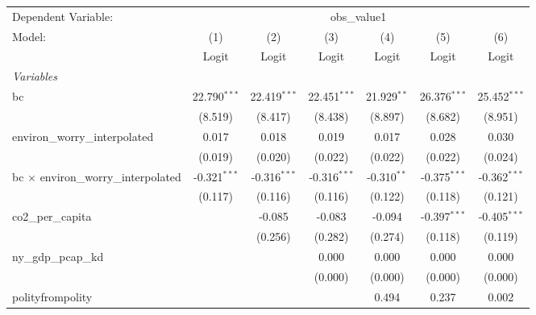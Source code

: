 
\begingroup
\centering
\begin{tabular}{lcccccc}
   \toprule
   Dependent Variable: & \multicolumn{6}{c}{obs\_value1}\\
   Model:                                      & (1)            & (2)            & (3)            & (4)           & (5)            & (6)\\  
                                               &  Logit         & Logit          & Logit          & Logit         & Logit          & Logit\\  
   \midrule
   \emph{Variables}\\
   bc                                          & 22.790$^{***}$ & 22.419$^{***}$ & 22.451$^{***}$ & 21.929$^{**}$ & 26.376$^{***}$ & 25.452$^{***}$\\   
                                               & (8.519)        & (8.417)        & (8.438)        & (8.897)       & (8.682)        & (8.951)\\   
   environ\_worry\_interpolated                & 0.017          & 0.018          & 0.019          & 0.017         & 0.028          & 0.030\\   
                                               & (0.019)        & (0.020)        & (0.022)        & (0.022)       & (0.022)        & (0.024)\\   
   bc $\times$ environ\_worry\_interpolated    & -0.321$^{***}$ & -0.316$^{***}$ & -0.316$^{***}$ & -0.310$^{**}$ & -0.375$^{***}$ & -0.362$^{***}$\\   
                                               & (0.117)        & (0.116)        & (0.116)        & (0.122)       & (0.118)        & (0.121)\\   
   co2\_per\_capita                            &                & -0.085         & -0.083         & -0.094        & -0.397$^{***}$ & -0.405$^{***}$\\   
                                               &                & (0.256)        & (0.282)        & (0.274)       & (0.118)        & (0.119)\\   
   ny\_gdp\_pcap\_kd                           &                &                & 0.000          & 0.000         & 0.000          & 0.000\\   
                                               &                &                & (0.000)        & (0.000)       & (0.000)        & (0.000)\\   
   polityfrompolity                            &                &                &                & 0.494         & 0.237          & 0.002\\   

\end{tabular}
